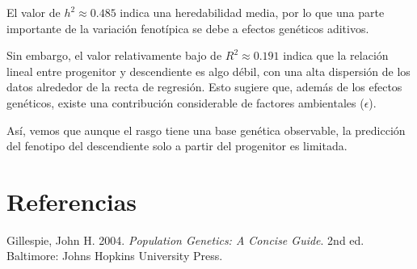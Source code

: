 \documentclass[
  11pt,
]{article}
\newlength{\cslhangindent}
\newenvironment{CSLReferences}[2] %
 {\begin{list}{}{%
  \setlength{\itemindent}{0pt}
  \setlength{\leftmargin}{0pt}
  \setlength{\parsep}{0pt}
  \ifodd #1
   \setlength{\leftmargin}{\cslhangindent}
   \setlength{\itemindent}{-1\cslhangindent}
  \fi
  \setlength{\itemsep}{#2\baselineskip}}}
 {\end{list}}
\begin{document}
El valor de \(h^2 \approx 0.485\) indica una heredabilidad media, por lo
que una parte importante de la variación fenotípica se debe a efectos
genéticos aditivos.

Sin embargo, el valor relativamente bajo de \(R^2 \approx 0.191\) indica
que la relación lineal entre progenitor y descendiente es algo débil,
con una alta dispersión de los datos alrededor de la recta de regresión.
Esto sugiere que, además de los efectos genéticos, existe una
contribución considerable de factores ambientales (\(\epsilon\)).

Así, vemos que aunque el rasgo tiene una base genética observable, la
predicción del fenotipo del descendiente solo a partir del progenitor es
limitada.

\section*{Referencias}\label{referencias}

\label{refs}
\begin{CSLReferences}{1}{0}
Gillespie, John H. 2004. \emph{Population Genetics: A Concise Guide}.
2nd ed. Baltimore: Johns Hopkins University Press.

\end{CSLReferences}
\end{document}
